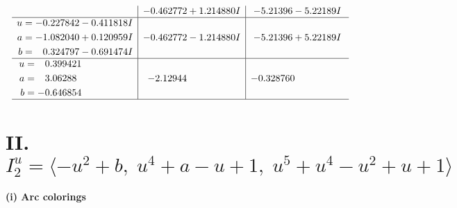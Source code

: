 \documentclass[1p]{elsarticle_modified}
\theoremstyle{definition}
\begin{document}
$$\begin{array}{c|c|c}
 & -0.462772 + 1.214880 I & -5.21396 - 5.22189 I \\ \hline\begin{aligned}
u &= -0.227842 - 0.411818 I \\
a &= -1.082040 + 0.120959 I \\
b &= \phantom{-}0.324797 - 0.691474 I\end{aligned}
 & -0.462772 - 1.214880 I & -5.21396 + 5.22189 I \\ \hline\begin{aligned}
u &= \phantom{-}0.399421\phantom{ +0.000000I} \\
a &= \phantom{-}3.06288\phantom{ +0.000000I} \\
b &= -0.646854\phantom{ +0.000000I}\end{aligned}
 & -2.12944\phantom{ +0.000000I} & -0.328760\phantom{ +0.000000I}\\
 \hline 
 \end{array}$$\newpage\newpage\renewcommand{\arraystretch}{1}
\centering \section*{II. $I^u_{2}= \langle - u^2+b,\;u^4+a- u+1,\;u^5+u^4- u^2+u+1 \rangle$}
\flushleft \textbf{(i) Arc colorings}\\
\end{document}
